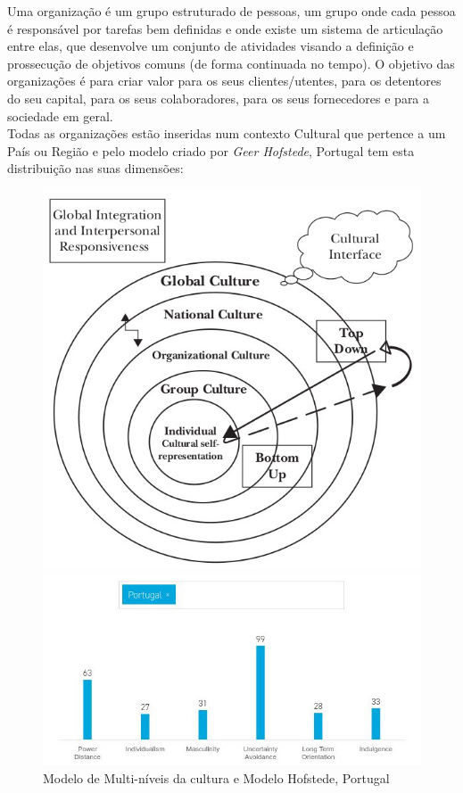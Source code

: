 Uma organização é um grupo estruturado de pessoas, um grupo onde cada pessoa é responsável por tarefas bem definidas e onde existe um sistema de articulação entre elas, que desenvolve um conjunto de atividades visando a definição e prossecução de objetivos comuns (de forma continuada no tempo). O objetivo das organizações é para criar valor para os seus clientes/utentes, para os detentores do seu capital, para os seus colaboradores, para os seus fornecedores e para a sociedade em geral.\cite{book_10}\\
\newpage
Todas as organizações estão inseridas num contexto Cultural que pertence a um País ou Região e pelo modelo criado por \textit{Geer Hofstede}, Portugal tem esta distribuição nas suas dimensões:
\begin{figure}[H]
\begin{minipage}{0.3\linewidth}
\flushleft
\includegraphics[scale=0.30]{./image/OB/OB_MUltilevelmodelCulture.jpg}
\end{minipage}
\hspace{1cm}
\begin{minipage}{0.4\linewidth}
\flushleft
\includegraphics[scale=0.44]{./image/OB/Hofstede_pt}
\end{minipage}
\caption{Modelo de Multi-níveis \cite{book_11} da cultura e Modelo Hofstede, Portugal}
\end{figure}
